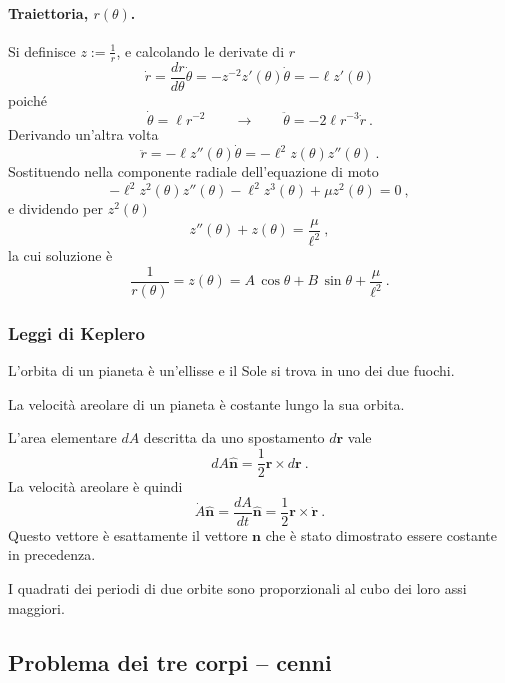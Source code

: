 \paragraph{Traiettoria, $r(\theta)$.} Si definisce $z := \frac{1}{r}$, e calcolando le derivate di $r$
\begin{equation}
    \dot{r} = \dfrac{d r}{d \theta} \dot{\theta} = - z^{-2} z'(\theta) \dot{\theta} = - \ell z'(\theta) 
\end{equation}
poiché
\begin{equation}
    \dot{\theta} = \ell r^{-2} \qquad \rightarrow \qquad \ddot{\theta} = -2 \ell r^{-3} \dot{r} \ .
\end{equation}
Derivando un'altra volta
\begin{equation}
    \ddot{r} = - \ell z''(\theta) \dot{\theta} = - \ell^2 z(\theta) z''(\theta)\ .
\end{equation}
Sostituendo nella componente radiale dell'equazione di moto
\begin{equation}
    - \ell^2 z^2(\theta) z''(\theta) - \ell^2 z^3(\theta) + \mu z^2(\theta) = 0 \ ,
\end{equation}
e dividendo per $z^2(\theta)$
\begin{equation}
    z''(\theta) + z(\theta) = \frac{\mu}{\ell^2} \ ,
\end{equation}
la cui soluzione è
\begin{equation}
    \dfrac{1}{r(\theta)} = z(\theta) = A \, \cos \theta + B \, \sin \theta + \frac{\mu}{\ell^2} \ .
\end{equation}

\subsubsection{Leggi di Keplero}
\begin{theorem} L'orbita di un pianeta è un'ellisse e il Sole si trova in uno dei due fuochi.
\end{theorem}
\begin{theorem} La velocità areolare di un pianeta è costante lungo la sua orbita.
\end{theorem}
L'area elementare $dA$ descritta da uno spostamento $d \mathbf{r}$ vale
\begin{equation}
    d A \mathbf{\hat{n}} = \frac{1}{2} \mathbf{r} \times d \mathbf{r}\ .
\end{equation}
La velocità areolare è quindi
\begin{equation}
    \dot{A} \mathbf{\hat{n}} = \dfrac{d A}{d t} \mathbf{\hat{n}} = \dfrac{1}{2} \mathbf{r} \times \dot{\mathbf{r}} \ .
\end{equation}
Questo vettore è esattamente il vettore $\mathbf{n}$ che è stato dimostrato essere costante in precedenza.


\begin{theorem} I quadrati dei periodi di due orbite sono proporzionali al cubo dei loro assi maggiori.
\end{theorem}

\subsection{Problema dei tre corpi -- cenni}


